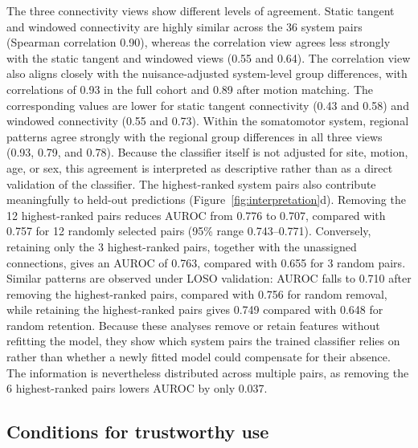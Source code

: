 The three connectivity views show different levels of agreement. Static tangent and windowed connectivity are highly similar across the 36 system pairs (Spearman correlation 0.90), whereas the correlation view agrees less strongly with the static tangent and windowed views (0.55 and 0.64). The correlation view also aligns closely with the nuisance-adjusted system-level group differences, with correlations of 0.93 in the full cohort and 0.89 after motion matching. The corresponding values are lower for static tangent connectivity (0.43 and 0.58) and windowed connectivity (0.55 and 0.73). Within the somatomotor system, regional patterns agree strongly with the regional group differences in all three views (0.93, 0.79, and 0.78). Because the classifier itself is not adjusted for site, motion, age, or sex, this agreement is interpreted as descriptive rather than as a direct validation of the classifier. The highest-ranked system pairs also contribute meaningfully to held-out predictions (Figure~\ref{fig:interpretation}d). Removing the 12 highest-ranked pairs reduces AUROC from 0.776 to 0.707, compared with 0.757 for 12 randomly selected pairs (95\% range 0.743--0.771). Conversely, retaining only the 3 highest-ranked pairs, together with the unassigned connections, gives an AUROC of 0.763, compared with 0.655 for 3 random pairs. Similar patterns are observed under LOSO validation: AUROC falls to 0.710 after removing the highest-ranked pairs, compared with 0.756 for random removal, while retaining the highest-ranked pairs gives 0.749 compared with 0.648 for random retention. Because these analyses remove or retain features without refitting the model, they show which system pairs the trained classifier relies on rather than whether a newly fitted model could compensate for their absence. The information is nevertheless distributed across multiple pairs, as removing the 6 highest-ranked pairs lowers AUROC by only 0.037.

\subsection{Conditions for trustworthy use}
\label{subsec:results-trust}

